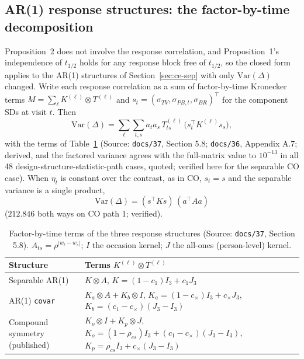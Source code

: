 \documentclass[11pt]{article}
\newcommand{\code}[1]{\texttt{#1}}
\begin{document}
\subsection{AR(1) response structures: the factor-by-time decomposition}
\label{sec:inve-cg-ar1}

Proposition~2 does not involve the response correlation, and
Proposition~1's independence of $t_{1/2}$ holds for any response block
free of $t_{1/2}$, so the closed form applies to the AR(1) structures of
Section~\ref{sec:ce-sep} with only $\mathrm{Var}(\Delta)$ changed. Write
each response correlation as a sum of factor-by-time Kronecker terms
$M = \sum_\ell K^{(\ell)} \otimes T^{(\ell)}$ and
$s_t = (\sigma_{TV}, \sigma_{PB,t}, \sigma_{BR})^\top$ for the component
SDs at visit $t$. Then
\begin{equation}
\mathrm{Var}(\Delta) = \sum_\ell \sum_{t,s} a_t a_s\, T^{(\ell)}_{ts}\,
  \big(s_t^\top K^{(\ell)} s_s\big),
\label{eq:inve-var-factor}
\end{equation}
with the terms of Table~\ref{tab:inve-terms} (Source: \code{docs/37},
Section 5.8; \code{docs/36}, Appendix A.7; derived, and the factored
variance agrees with the full-matrix value to $10^{-13}$ in all 48
design-structure-statistic-path cases, quoted; verified here for the
separable CO case). When $\eta_t$ is constant over the contrast, as in
CO, $s_t = s$ and the separable variance is a single product,
\begin{equation}
\mathrm{Var}(\Delta) = (s^\top K s)\,(a^\top A a)
\label{eq:inve-var-sep}
\end{equation}
($212.846$ both ways on CO path 1; verified).

\begin{table}[h]
\centering\small
\caption{Factor-by-time terms of the three response structures (Source:
\code{docs/37}, Section 5.8). $A_{ts} = \rho^{|w_t - w_s|}$; $I$ the
occasion kernel; $J$ the all-ones (person-level) kernel.}
\label{tab:inve-terms}
\begin{tabular}{@{}lp{9.6cm}@{}}
\toprule
Structure & Terms $K^{(\ell)} \otimes T^{(\ell)}$ \\
\midrule
Separable AR(1) & $K\otimes A$, $K = (1-c_1)I_3 + c_1J_3$ \\
AR(1) \code{covar} & $K_a\otimes A + K_b\otimes I$, $K_a = (1-c_\times)I_3 + c_\times J_3$,
  $K_b = (c_1-c_\times)(J_3-I_3)$ \\
Compound symmetry (published) & $K_o\otimes I + K_p\otimes J$,
  $K_o = (1-\rho_{cs})I_3 + (c_1-c_\times)(J_3-I_3)$, $K_p = \rho_{cs} I_3 + c_\times(J_3-I_3)$ \\
\bottomrule
\end{tabular}
\end{table}
\end{document}

